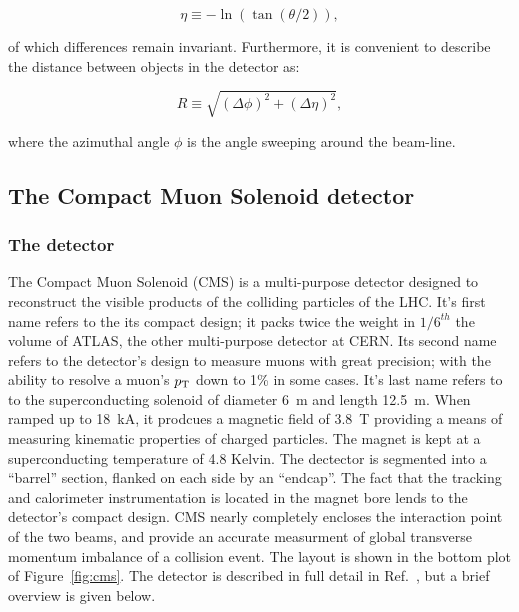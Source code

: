 \begin{equation}
        \eta \equiv −\ln\left( \tan\left(\theta/2\right)\right),
        \label{pseudo}      
\end{equation}

of which differences remain invariant. Furthermore, it is convenient to describe the distance between
objects in the detector as:

\begin{equation}
        R \equiv \sqrt{\left(\Delta\phi\right)^2 + \left(\Delta\eta\right)^2},
        \label{pseudo}      
\end{equation}

where the azimuthal angle $\phi$ is the angle sweeping around the beam-line.

\subsection{The Compact Muon Solenoid detector\label{sec:cms}}

\subsubsection{The detector}
The Compact Muon Solenoid (CMS) is a multi-purpose detector designed to reconstruct
the visible products of the colliding particles of the LHC. It's first name refers to 
the its compact design; it packs twice the weight in $1/6^{th}$ the volume of ATLAS, 
the other multi-purpose detector at CERN. Its second name refers to the detector's design
to measure muons with great precision; with the ability to resolve a muon's $p_{\mathrm{T}}$ down to 
1\% in some cases. It's last name refers to to the superconducting solenoid of diameter 
6~m and length 12.5~m. When ramped up to 18~kA, it prodcues a magnetic field of 3.8~T providing
a means of measuring kinematic properties of charged particles. The magnet is kept at a 
superconducting temperature of 4.8 Kelvin. The dectector is segmented into a ``barrel'' 
section, flanked on each side by an ``endcap''. The fact that the tracking and calorimeter 
instrumentation is located in the magnet bore lends to the detector's compact design. 
CMS nearly completely encloses the interaction point of the two beams, and provide an 
accurate measurment of global transverse momentum imbalance of a collision event. The 
layout is shown in the bottom plot of Figure~\ref{fig:cms}. The detector is described in 
full detail in Ref.~\cite{1748-0221-3-08-S08004,Bayatian:922757,Bayatian:942733}, but a brief
overview is given below. 

